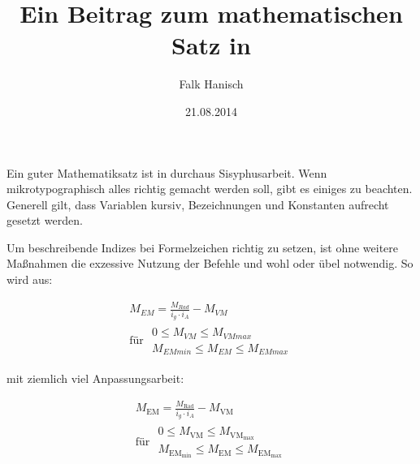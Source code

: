 \documentclass[english,ngerman]{tudscrartcl}
\begin{document}
\title{Ein Beitrag zum mathematischen Satz in }
\author{Falk Hanisch}
\date{21.08.2014}
\StartTutorial
{}

Ein guter Mathematiksatz ist in  durchaus Sisyphusarbeit. Wenn 
mikrotypographisch alles richtig gemacht werden soll, gibt es einiges zu 
beachten. Generell gilt, dass Variablen kursiv, Bezeichnungen und Konstanten
aufrecht gesetzt werden.

Um beschreibende Indizes bei Formelzeichen richtig zu setzen, ist ohne weitere 
Maßnahmen die exzessive Nutzung der Befehle \PParameter{\dots} 
und \PParameter{\dots} wohl oder übel notwendig. So wird aus:

\begin{Tutorial}
\begin{equation*}
\begin{gathered}
M_{EM} = \frac{M_{Rad}}{i_g \cdot i_A} - M_{VM} \\
\textrm{für }
\begin{aligned}
0\leq M_{VM}\leq M_{VMmax} \\ 
M_{EMmin}\leq M_{EM}\leq M_{EMmax}
\end{aligned}
\end{gathered}
\end{equation*}
\end{Tutorial}

mit ziemlich viel Anpassungsarbeit:

\begin{Tutorial}
\begin{equation*}
\begin{gathered}
M_\mathrm{EM} = \frac{M_\mathrm{Rad}}{i_g \cdot i_A} - M_\mathrm{VM} \\
\textrm{für }
\begin{aligned}
0\leq M_\mathrm{VM}\leq M_\mathrm{VM_{max}} \\ 
M_\mathrm{EM_{min}}\leq M_\mathrm{EM}\leq M_\mathrm{EM_{max}}
\end{aligned}
\end{gathered}
\end{equation*}
\end{Tutorial}
\end{document}
